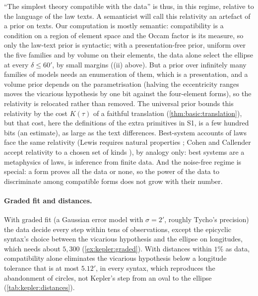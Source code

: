 ``The simplest theory compatible with the data'' is thus, in this regime, relative to the language of the law texts. A semanticist will call this relativity an artefact of a prior on texts. Our computation is mostly semantic: compatibility is a condition on a region of element space and the Occam factor is its measure, so only the law-text prior is syntactic; with a presentation-free prior, uniform over the five families and by volume on their elements, the data alone select the ellipse at every $\delta\le60'$, by small margins ((ii) above). But a prior over infinitely many families of models needs an enumeration of them, which is a presentation, and a volume prior depends on the parametrisation (halving the eccentricity ranges moves the vicarious hypothesis by one bit against the four-element forms), so the relativity is relocated rather than removed. The universal prior bounds this relativity by the cost $K(\tau)$ of a faithful translation (\cref{thm:basic:translation}), but that cost, here the definitions of the extra primitives in S1, is a few hundred bits (an estimate), as large as the text differences. Best-system accounts of laws face the same relativity (Lewis requires natural properties \citep{lewis1983new}; Cohen and Callender accept relativity to a chosen set of kinds \citep{cohen2009better}), by analogy only: best systems are a metaphysics of laws, \SAIabbr is inference from finite data. And the noise-free regime is special: a form proves all the data or none, so the power of the data to discriminate among compatible forms does not grow with their number.

\paragraph{Graded fit and distances.} With graded fit (a Gaussian error model with $\sigma=2'$, roughly Tycho's precision) the data decide every step within tens of observations, except the epicyclic syntax's choice between the vicarious hypothesis and the ellipse on longitudes, which needs about $5{,}300$ (\cref{ex:kepler:graded}). With distances within $1\%$ as data, compatibility alone eliminates the vicarious hypothesis below a longitude tolerance that is at most $5.12'$, in every syntax, which reproduces the abandonment of circles, not Kepler's step from an oval to the ellipse (\cref{tab:kepler:distances}).

